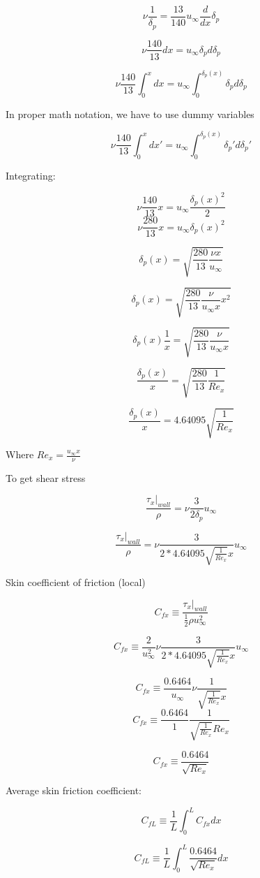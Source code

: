 \documentclass[11pt]{article}
\begin{document}
$$ \nu \frac{1}{ \delta_p}   = \frac{13}{140} u_\infty \frac{d}{d x}  \delta_p  $$

$$ \nu \frac{140}{13}  dx = u_\infty  \delta_p  d \delta_p  $$

$$ \nu \frac{140}{13} \int_0^x dx = u_\infty \int_0^{\delta_p (x)} \delta_p  d \delta_p  $$

In proper math notation, we have to use dummy variables

$$ \nu \frac{140}{13} \int_0^x dx' = u_\infty \int_0^{\delta_p (x)} \delta_p'  d \delta_p'  $$

Integrating:

$$ \nu \frac{140}{13} x= u_\infty \frac{\delta_p (x)^2}{2}  $$
$$ \nu \frac{280}{13} x= u_\infty \delta_p (x)^2  $$

$$\delta_p (x) = \sqrt{\frac{280}{13} \frac{\nu x}{u_\infty}}$$

$$\delta_p (x) = \sqrt{\frac{280}{13} \frac{\nu}{u_\infty x} x^2}$$

$$\delta_p (x) \frac{1}{x} = \sqrt{\frac{280}{13} \frac{\nu}{u_\infty x} }$$


$$ \frac{\delta_p (x)}{x} = \sqrt{\frac{280}{13} \frac{1}{Re_x} }$$


$$ \frac{\delta_p (x)}{x} =  4.64095 \sqrt{ \frac{1}{Re_x} }$$

Where $Re_x = \frac{u_\infty x}{\nu}$

To get shear stress

$$\frac{\tau_x|_{wall}}{\rho} = \nu \frac{3}{2 \delta_p} u_\infty $$

$$\frac{\tau_x|_{wall}}{\rho} = \nu \frac{3}{2* 4.64095 \sqrt{ \frac{1}{Re_x} } x} u_\infty $$

Skin coefficient of friction (local)

$$C_{fx} \equiv \frac{\tau_x |_{wall}}{\frac{1}{2} \rho u_\infty^2}$$

$$C_{fx} \equiv \frac{2}{ u_\infty^2} \nu \frac{3}{2* 4.64095 \sqrt{ \frac{1}{Re_x} } x} u_\infty$$


$$C_{fx} \equiv \frac{0.6464}{ u_\infty} \nu \frac{1}{\sqrt{ \frac{1}{Re_x} } x} $$
$$C_{fx} \equiv \frac{0.6464}{ 1}  \frac{1}{\sqrt{ \frac{1}{Re_x} } Re_x} $$

$$C_{fx} \equiv \frac{0.6464}{ \sqrt{Re_x}}  $$

Average skin friction coefficient:

$$C_{fL} \equiv \frac{1}{L} \int_0^L C_{fx} dx$$

$$C_{fL} \equiv \frac{1}{L} \int_0^L\frac{0.6464}{ \sqrt{Re_x}} dx$$
\end{document}
